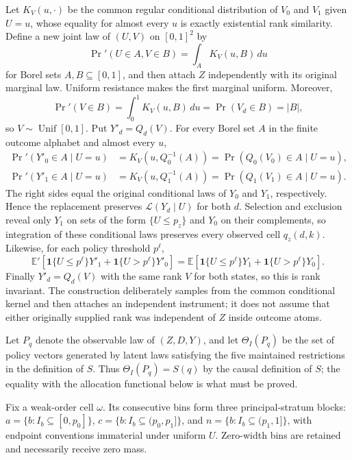 Let \(K_V(u,\cdot)\) be the common regular conditional distribution of \(V_0\) and \(V_1\) given \(U=u\), whose equality for almost every \(u\) is exactly existential rank similarity.  Define a new joint law of \((U,V)\) on \([0,1]^2\) by
\[
\Pr'(U\in A,V\in B)=\int_A K_V(u,B)\,du
\]
for Borel sets \(A,B\subseteq[0,1]\), and then attach \(Z\) independently with its original marginal law.  Uniform resistance makes the first marginal uniform.  Moreover,
\[
\Pr'(V\in B)=\int_0^1K_V(u,B)\,du=\Pr(V_d\in B)=|B|,
\]
so \(V\sim\operatorname{Unif}[0,1]\).  Put \(Y'_d=Q_d(V)\).  For every Borel set \(A\) in the finite outcome alphabet and almost every \(u\),
\[
\begin{aligned}
\Pr'(Y'_0\in A\mid U=u)
 &=K_V(u,Q_0^{-1}(A))
 =\Pr(Q_0(V_0)\in A\mid U=u),\\
\Pr'(Y'_1\in A\mid U=u)
 &=K_V(u,Q_1^{-1}(A))
 =\Pr(Q_1(V_1)\in A\mid U=u).
\end{aligned}
\]
The right sides equal the original conditional laws of \(Y_0\) and \(Y_1\), respectively.  Hence the replacement preserves \(\mathcal L(Y_d\mid U)\) for both \(d\).  Selection and exclusion reveal only \(Y_1\) on sets of the form \(\{U\le p_z\}\) and \(Y_0\) on their complements, so integration of these conditional laws preserves every observed cell \(q_z(d,k)\).  Likewise, for each policy threshold \(p^\ell\),
\[
\mathbb E'[\mathbf 1\{U\le p^\ell\}Y'_1+\mathbf 1\{U>p^\ell\}Y'_0]
=\mathbb E[\mathbf 1\{U\le p^\ell\}Y_1+\mathbf 1\{U>p^\ell\}Y_0].
\]
Finally \(Y'_d=Q_d(V)\) with the same rank \(V\) for both states, so this is rank invariant.  The construction deliberately samples from the common conditional kernel and then attaches an independent instrument; it does not assume that either originally supplied rank was independent of \(Z\) inside outcome atoms.

Let \(P_q\) denote the observable law of \((Z,D,Y)\), and let \(\Theta_I(P_q)\) be the set of policy vectors generated by latent laws satisfying the five maintained restrictions in the definition of \(S\).  Thus \(\Theta_I(P_q)=S(q)\) by the causal definition of \(S\); the equality with the allocation functional below is what must be proved.

Fix a weak-order cell \(\omega\).  Its consecutive bins form three principal-stratum blocks: \(a=\{b:I_b\subseteq[0,p_0]\}\), \(c=\{b:I_b\subseteq(p_0,p_1]\}\), and \(n=\{b:I_b\subseteq(p_1,1]\}\), with endpoint conventions immaterial under uniform \(U\).  Zero-width bins are retained and necessarily receive zero mass.

